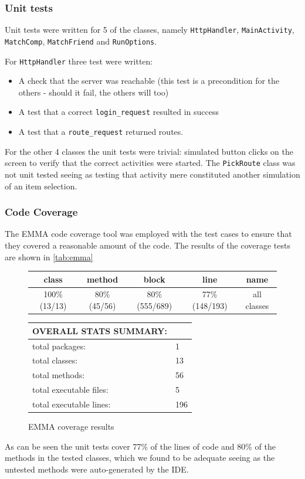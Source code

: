 \subsubsection{Unit tests}
Unit tests were written for 5 of the classes, namely \texttt{HttpHandler}, \texttt{MainActivity}, \texttt{MatchComp}, \texttt{MatchFriend} and \texttt{RunOptions}. 
\vspace{10pt}

For \texttt{HttpHandler} three test were written:
\begin{itemize}
\item A check that the server was reachable (this test is a precondition for the others - should it fail, the others will too)
\item A test that a correct \texttt{login\_request} resulted in success 
\item A test that a \texttt{route\_request} returned routes.
\end{itemize}
\vspace{10pt}

For the other 4 classes the unit tests were trivial: simulated button clicks on the screen to verify that the correct activities were started. The \texttt{PickRoute} class was not unit tested seeing as testing that activity mere constituted another simulation of an item selection.

\subsubsection{Code Coverage}
The EMMA code coverage tool was employed with the test cases to ensure that they covered a reasonable amount of the code. The results of the coverage tests are shown in \autoref{tab:emma}

\begin{figure}[ht]
\caption{EMMA coverage results}
\label{tab:emma}
\begin{tabular}{| c | c | c | c | c |}
\hline
class & method & block & line & name \\ \hline
100\% (13/13) & 80\% (45/56) & 80\% (555/689) & 77\% (148/193) & all classes \\
\hline
\end{tabular}
\vspace{10pt}

\begin{tabular}{| l | l |}
\hline
OVERALL STATS SUMMARY: & \\ \hline
total packages: & 1 \\
total classes: & 13 \\
total methods: & 56 \\
total executable files: & 5 \\
total executable lines: & 196 \\
\hline
\end{tabular}
\end{figure}

As can be seen the unit tests cover 77\% of the lines of code and 80\% of the methods in the tested classes, which we found to be adequate seeing as the untested methods were auto-generated by the \ac{IDE}.  